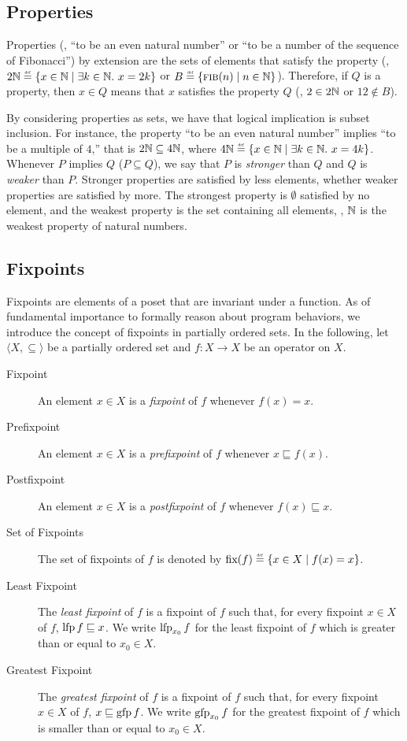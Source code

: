 \subsection{Properties}

Properties (\eg, ``to be an even natural number'' or ``to be a number of the sequence of Fibonacci'') by extension are the sets of elements that satisfy the property (\eg, $2\N \defeq \setdef{x \in \N}{\exists k \in \N.\spacer x = 2k}$ or $B \defeq \setdef{\textsc{fib}(n)}{n\in\N}$). Therefore, if $Q$ is a property, then $x \in Q$ means that $x$ satisfies the property $Q$ (\eg, $2 \in 2\mathbb{N}$ or $12 \notin B$).

By considering properties as sets, we have that logical implication is subset inclusion. For instance, the property ``to be an even natural number'' implies ``to be a multiple of $4$,'' that is $2\mathbb{N} \subseteq 4\mathbb{N}$, where $4\N \defeq \setdef{x \in \N}{\exists k \in \N.\spacer x = 4k}$.
Whenever $P$ implies $Q$ ($P \subseteq Q$), we say that $P$ is \emph{stronger} than $Q$ and $Q$ is \emph{weaker} than $P$.
Stronger properties are satisfied by less elements, whether weaker properties are satisfied by more.
The strongest property is $\emptyset$ satisfied by no element, and the weakest property is the set containing all elements, \eg, $\mathbb{N}$ is the weakest property of natural numbers.


\subsection{Fixpoints}

Fixpoints are elements of a poset that are invariant under a function.
As of fundamental importance to formally reason about program behaviors, we introduce the concept of fixpoints in partially ordered sets.
In the following, let $\langle X, \subseteq \rangle$ be a partially ordered set and $f : X \to X$ be an operator on $X$.

\begin{description}
  \item[Fixpoint] An element $x \in X$ is a \emph{fixpoint} of $f$ whenever $f(x) = x$.
  \item[Prefixpoint] An element $x \in X$ is a \emph{prefixpoint} of $f$ whenever $x \sqsubseteq f(x)$.
  \item[Postfixpoint] An element $x \in X$ is a \emph{postfixpoint} of $f$ whenever $f(x) \sqsubseteq x$.
  \item[Set of Fixpoints] The set of fixpoints of $f$ is denoted by $\fixpoints(f) \defeq \setdef{x \in X}{f(x) = x}$.
  \item[Least Fixpoint] The \emph{least fixpoint} of $f$ is a fixpoint of $f$ such that, for every fixpoint $x \in X$ of $f$, $\operatorname{lfp} f \sqsubseteq x$. We write $\operatorname{lfp}_{x_0} f$ for the least fixpoint of $f$ which is greater than or equal to $x_0 \in X$.
  \item[Greatest Fixpoint] The \emph{greatest fixpoint} of $f$ is a fixpoint of $f$ such that, for every fixpoint $x \in X$ of $f$, $x \sqsubseteq \operatorname{gfp} f$. We write $\operatorname{gfp}_{x_0} f$ for the greatest fixpoint of $f$ which is smaller than or equal to $x_0 \in X$.
\end{description}

